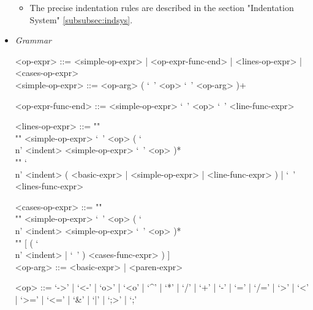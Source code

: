 \documentclass{article}
\begin{document}
\begin{itemize}
\begin{itemize}
\item
The precise indentation rules are described in the section
"Indentation System" \ref{subsubsec:indsys}.
\end{itemize}

\item \textit{Grammar}
\begin{grammar}
<op-expr> ::=
<simple-op-expr> | <op-expr-func-end> | <lines-op-expr> | <cases-op-expr>
\\

<simple-op-expr> ::=  <op-arg> ( `\ ' <op>  `\ ' <op-arg> )+

<op-expr-func-end> ::= <simple-op-expr> `\ '  <op> `\ ' <line-func-expr>

<lines-op-expr> ::= ""\\""
<simple-op-expr> `\ ' <op>
( `\\n' <indent> <simple-op-expr> `\ ' <op> )* \\""
`\\n' <indent> ( <basic-expr> | <simple-op-expr> | <line-func-expr> )
  | `\ ' <lines-func-expr>

<cases-op-expr> ::= ""\\""
<simple-op-expr> `\ ' <op> 
( `\\n' <indent> <simple-op-expr> `\ ' <op> )*  \\""
[ ( `\\n' <indent> | `\ ' ) <cases-func-expr> ) ] 
\\

<op-arg> ::= <basic-expr> | <paren-expr>

<op> ::= 
`->' | `<-' | `o>' | `<o' | `^' | `*' | `/' | `+' | `-' |
`=' | `/=' | `>' | `<' | `>=' | `<=' | `\&' | `|' | `;>' | `;'\\
\end{grammar}
\end{itemize}
\end{document}
